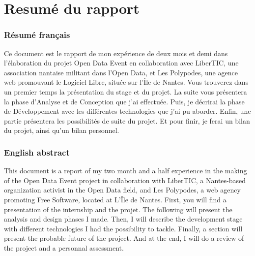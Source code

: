 \part*{Resumé du rapport}

\section*{Résumé français}

Ce document est le rapport de mon expérience de deux mois et demi dans l'élaboration du projet Open Data Event en collaboration avec LiberTIC, une association nantaise militant dans l'Open Data, et Les Polypodes, une agence web promouvant le Logiciel Libre, située sur l'Île de Nantes. Vous trouverez dans un premier temps la présentation du stage et du projet. La suite vous présentera la phase d'Analyse et de Conception que j'ai effectuée. Puis, je décrirai la phase de Développement avec les différentes technologies que j'ai pu aborder. Enfin, une partie présentera les possibilités de suite du projet. Et pour finir, je ferai un bilan du projet, ainsi qu'un bilan personnel.

\section*{English abstract}

This document is a report of my two month and a half experience in the making of the Open Data Event project in collaboration with LiberTIC, a Nantes-based organization activist in the Open Data field, and Les Polypodes, a web agency promoting Free Software, located at L'Île de Nantes. First, you will find a presentation of the internship and the projet. The following will present the analysis and design phases I made. Then, I will describe the development stage with different technologies I had the possibility to tackle. Finally, a section will present the probable future of the project. And at the end, I will do a review of the project and a personnal assessment.
